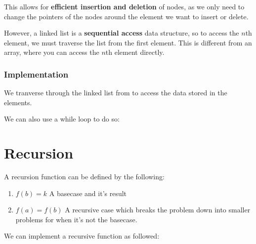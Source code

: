 \documentclass{article}
\begin{document}
This allows for \textbf{efficient insertion and deletion} of nodes, as we only need to change the pointers of the nodes around the element we want to insert or delete.

However, a linked list is a \textbf{sequential access} data structure, so to access the $n$th element, we must traverse the list from the first element. This is different from an array, where you can access the $n$th element directly.

\subsubsection{Implementation}

We tranverse through the linked list from  to access the data stored in the elements.

We can also use a while loop to do so:


\section{Recursion}
A recursion function can be defined by the following:
\begin{enumerate}
    \item $f(b)=k$ A basecase and it's result
    \item $f(a)=f(b)$ A recursive case which breaks the problem down into smaller problems for when it's not the basecase.
\end{enumerate}
We can implement a recursive function as followed:

\end{document}
